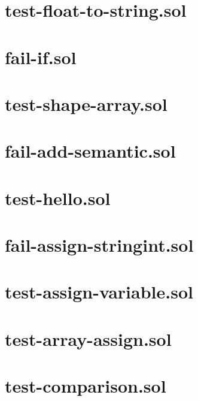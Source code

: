 \section{test-float-to-string.sol}


\section{fail-if.sol}


\section{test-shape-array.sol}


\section{fail-add-semantic.sol}


\section{test-hello.sol}


\section{fail-assign-stringint.sol}


\section{test-assign-variable.sol}


\section{test-array-assign.sol}


\section{test-comparison.sol}


